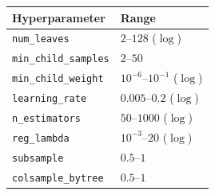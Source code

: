 \begin{tabular}{ll}
\toprule
Hyperparameter & Range \\
\midrule
\texttt{num\_leaves} & $2$--$128$ ($\log$) \\
\texttt{min\_child\_samples} & $2$--$50$ \\
\texttt{min\_child\_weight} & $10^{-6}$--$10^{-1}$ ($\log$) \\
\texttt{learning\_rate} & $0.005$--$0.2$ ($\log$) \\
\texttt{n\_estimators} & $50$--$1000$ ($\log$) \\
\texttt{reg\_lambda} & $10^{-3}$--$20$ ($\log$) \\
\texttt{subsample} & $0.5$--$1$ \\
\texttt{colsample\_bytree} & $0.5$--$1$ \\
\bottomrule
\end{tabular}
